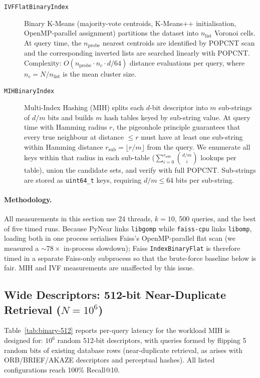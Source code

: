 \documentclass[11pt,a4paper]{article}
\begin{document}
\begin{description}
  \item[\texttt{IVFFlatBinaryIndex}] Binary K-Means (majority-vote centroids,
    K-Means++ initialisation, OpenMP-parallel assignment) partitions the
    dataset into $n_{\mathrm{list}}$ Voronoi cells.  At query time, the
    $n_{\mathrm{probe}}$ nearest centroids are identified by POPCNT scan and
    the corresponding inverted lists are searched linearly with POPCNT.
    Complexity: $O(n_{\mathrm{probe}} \cdot n_c \cdot d/64)$ distance
    evaluations per query, where $n_c = N / n_{\mathrm{list}}$ is the mean
    cluster size.

  \item[\texttt{MIHBinaryIndex}] Multi-Index Hashing (MIH) splits each
    $d$-bit descriptor into $m$ sub-strings of $d/m$ bits and builds $m$
    hash tables keyed by sub-string value.  At query time with Hamming radius
    $r$, the pigeonhole principle guarantees that every true neighbour at
    distance $\le r$ must have at least one sub-string within Hamming distance
    $r_{\mathrm{sub}} = \lfloor r/m \rfloor$ from the query.  We enumerate
    all keys within that radius in each sub-table
    ($\sum_{i=0}^{r_{\mathrm{sub}}} \binom{d/m}{i}$ lookups per table), union
    the candidate sets, and verify with full POPCNT.  Sub-strings are stored
    as \texttt{uint64\_t} keys, requiring $d/m \le 64$ bits per sub-string.
\end{description}

\paragraph{Methodology.}
All measurements in this section use 24 threads, $k = 10$, 500 queries,
and the best of five timed runs.  Because PyNear links \texttt{libgomp}
while \texttt{faiss-cpu} links \texttt{libomp}, loading both in one process
serialises Faiss's OpenMP-parallel flat scan (we measured a ${\sim}78\times$
in-process slowdown); Faiss \texttt{IndexBinaryFlat} is therefore timed in a
separate Faiss-only subprocess so that the brute-force baseline below is
fair.  MIH and IVF measurements are unaffected by this issue.

\subsection{Wide Descriptors: 512-bit Near-Duplicate Retrieval ($N = 10^6$)}
\label{sec:approx-binary-512}

Table~\ref{tab:binary-512} reports per-query latency for the workload MIH
is designed for: $10^6$ random 512-bit descriptors, with queries formed by
flipping 5 random bits of existing database rows (near-duplicate retrieval,
as arises with ORB/BRIEF/AKAZE descriptors and perceptual hashes).  All
listed configurations reach 100\% Recall@10.
\end{document}

